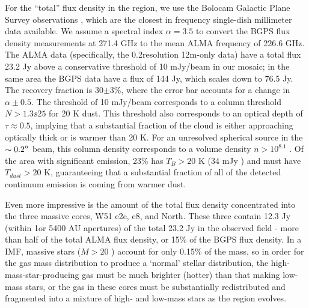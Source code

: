 \documentclass[twocolumn]{aastex61}
\begin{document}
For the ``total'' flux density in the region, we use the Bolocam Galactic Plane
Survey observations \citep{Aguirre2011a,Ginsburg2013a}, which are the closest
in frequency single-dish millimeter data available.  We assume a spectral index
$\alpha=3.5$ to convert the BGPS flux density measurements at 271.4 GHz to the
mean ALMA frequency of 226.6 GHz.  The ALMA data (specifically, the
0.2\arcsec resolution 12m-only data) have a total flux 23.2 Jy above a  conservative
threshold of 10 mJy/beam in our
mosaic; in the same area the BGPS data have a flux of 144 Jy, which scales down to
76.5 Jy.  The recovery fraction is 30$\pm3$\%, where the error bar accounts
for a change in $\alpha\pm0.5$.  The threshold of 10 mJy/beam corresponds to a
column threshold $N>1.3\ee{25}$ \percc for 20 K dust. This threshold also
corresponds to an optical depth of $\tau\approx0.5$, implying that a substantial
fraction of the cloud is either approaching optically thick or is warmer than 20
K.  For an unresolved spherical source in the $\sim0.2\mbox{$^{\prime\prime}$}$ beam, this
column density corresponds to a volume density $n>10^{8.1}$ \percc.
Of the area with significant emission, 23\% has $T_B>20$ K (34 mJy \perbeam)
and must have $T_{dust}>20$ K, guaranteeing that a substantial fraction of all
of the detected continuum emission is coming from warmer dust.


Even more impressive is the amount of the total flux density concentrated
into the three massive cores, W51 e2e, e8, and North.  These three contain
12.3 Jy (within 1\arcsec or 5400 AU apertures) of the total 23.2 Jy in the
observed field - more than half of the total ALMA flux density, or 15\% of the
BGPS flux density.  In a \citet{Kroupa2001a} IMF, massive stars ($M>20$ \msun)
account for only 0.15\% of the mass, so in order for the gas mass distribution
to produce a `normal' stellar distribution, the high-mass-star-producing gas
must be much brighter (hotter) than that making low-mass stars, or the gas 
in these cores must be substantially redistributed and fragmented into a
mixture of high- and low-mass stars as the region evolves.

\end{document}

